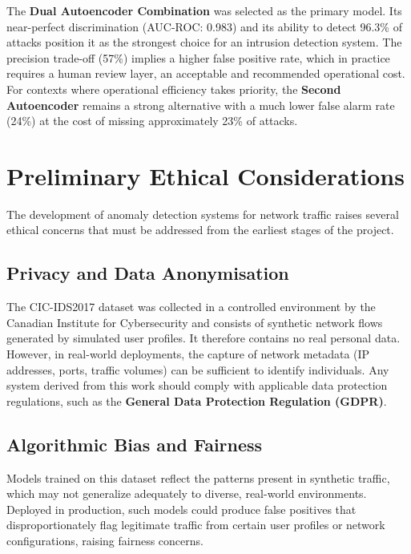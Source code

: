 \documentclass[11pt]{article}
\begin{document}
The \textbf{Dual Autoencoder Combination} was selected as the primary model. Its near-perfect discrimination (AUC-ROC: 0.983) and its ability to detect 96.3\% of attacks position it as the strongest choice for an intrusion detection system. The precision trade-off (57\%) implies a higher false positive rate, which in practice requires a human review layer, an acceptable and recommended operational cost. For contexts where operational efficiency takes priority, the \textbf{Second Autoencoder} remains a strong alternative with a much lower false alarm rate (24\%) at the cost of missing approximately 23\% of attacks.


\section{Preliminary Ethical Considerations}

The development of anomaly detection systems for network traffic raises several ethical concerns that must be addressed from the earliest stages of the project.

\subsection{Privacy and Data Anonymisation}
The CIC-IDS2017 dataset was collected in a controlled environment by the Canadian Institute for Cybersecurity and consists of synthetic network flows generated by simulated user profiles. It therefore contains no real personal data. However, in real-world deployments, the capture of network metadata (IP addresses, ports, traffic volumes) can be sufficient to identify individuals. Any system derived from this work should comply with applicable data protection regulations, such as the \textbf{General Data Protection Regulation (GDPR)}.

\subsection{Algorithmic Bias and Fairness}
Models trained on this dataset reflect the patterns present in synthetic traffic, which may not generalize adequately to diverse, real-world environments. Deployed in production, such models could produce false positives that disproportionately flag legitimate traffic from certain user profiles or network configurations, raising fairness concerns.
\end{document}
